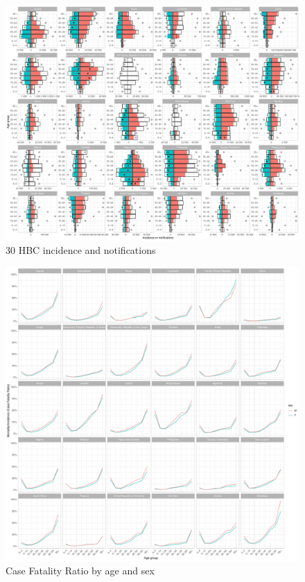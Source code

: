 \documentclass[12pt]{article}
\begin{document}
\FloatBarrier


\begin{figure}
\centering
\includegraphics[width=1\textwidth]{../plots/aF1.pdf}
\caption{30 HBC incidence and notifications}
\end{figure}


\FloatBarrier


\begin{figure}
  \centering
  \includegraphics[width=1\textwidth]{../plots/aF4.pdf}
  \caption{Case Fatality Ratio by age and sex}
\end{figure}
\end{document}

